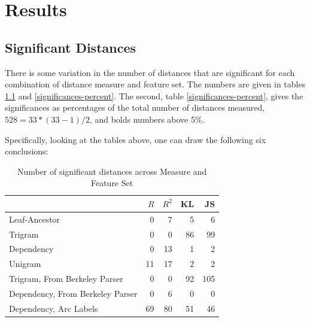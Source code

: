 \chapter{Results}

\section{Significant Distances}

There is some variation in the number of distances that are
significant for each combination of distance measure and feature
set. The numbers are given in tables \ref{significances} and
\ref{significances-percent}. The second, table
\ref{significances-percent}, gives the significances as percentages of
the total number of distances measured, $528 = 33 * (33 - 1) / 2$, and
bolds numbers above 5\%.

Specifically, looking at the tables above, one can draw the following
six conclusions:

\begin{table}
\begin{tabular}{l|rrrr}
  & $R$ & $R^2$ & KL & JS  \\ \hline
  Leaf-Ancestor                             & 0 & 7 & 5& 6 \\
  Trigram                                      & 0 & 0 & 86 & 99 \\
  Dependency                                & 0 & 13 & 1 & 2 \\
  Unigram                                      & 11 & 17 & 2 & 2 \\
  Trigram, From Berkeley Parser      & 0 & 0 & 92 & 105 \\
  Dependency, From Berkeley Parser & 0 & 6 & 0 & 0 \\
  Dependency, Arc Labels                & 69 & 80 & 51 & 46 \\
\end{tabular} \\
\label{significances}
\caption{Number of significant distances across Measure and Feature
  Set}
\end{table}

